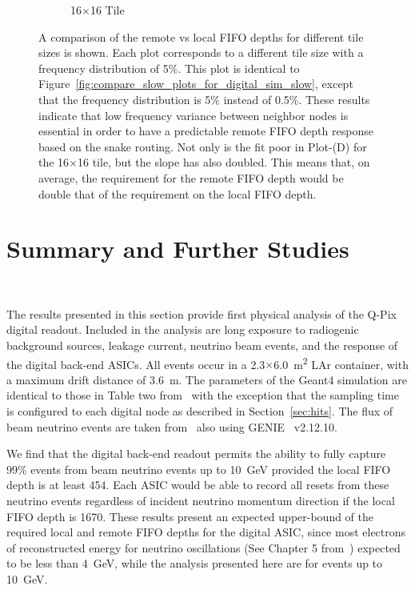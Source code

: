 \begin{figure}
\begin{subfigure}[b]{0.475\textwidth}
      \caption[]%
      {\small 16$\times$16 Tile}    
  \end{subfigure}
  \caption[]
  {\small A comparison of the remote vs local FIFO depths for different tile sizes is shown.
  Each plot corresponds to a different tile size with a frequency distribution of 5\%.
  This plot is identical to Figure~\ref{fig:compare_slow_plots_for_digital_sim_slow}, except that the frequency distribution is 5\% instead of 0.5\%.
  These results indicate that low frequency variance between neighbor nodes is essential in order to have a predictable remote FIFO depth response based on the snake routing.
  Not only is the fit poor in Plot-(D) for the 16$\times$16 tile, but the slope has also doubled.
  This means that, on average, the requirement for the remote FIFO depth would be double that of the requirement on the local FIFO depth.
} 
  \label{fig:compare_fast_plots_for_digital_sim_fast}
\end{figure}







\section{Summary and Further Studies}~\label{sec:further_studies}

The results presented in this section provide first physical analysis of the Q-Pix digital readout.
Included in the analysis are long exposure to radiogenic background sources, leakage current, neutrino beam events, and the response of the digital back-end ASICs.
All events occur in a 2.3$\times$6.0~\unit{m^{2}} LAr container, with a maximum drift distance of 3.6~\unit{m}.
The parameters of the Geant4 simulation are identical to those in Table two from~\citep{qpix:shion} with the exception that the sampling time is configured to each digital node as described in Section~\ref{sec:hits}.
The flux of beam neutrino events are taken from~\citep{dune_2021_near_detector_cdr} also using GENIE~\citep{Andreopoulos:2009rq} v2.12.10.

We find that the digital back-end readout permits the ability to fully capture 99\% events from beam neutrino events up to 10~\unit{GeV} provided the local FIFO depth is at least 454.
Each ASIC would be able to record all resets from these neutrino events regardless of incident neutrino momentum direction if the local FIFO depth is 1670.
These results present an expected upper-bound of the required local and remote FIFO depths for the digital ASIC, since most electrons of reconstructed energy for neutrino oscillations (See Chapter 5 from~\citep{DUNE_TDRv3_Abi_2020}) expected to be less than 4~\unit{GeV}, while the analysis presented here are for events up to 10~\unit{GeV}.

